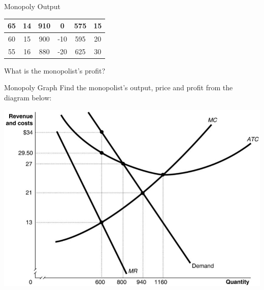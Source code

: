 \documentclass{beamer}
\begin{document}
\begin{frame}[t]{Monopoly Output}
\begin{table}[H]
\begin{tabular}{cccccc}
    65         & 14                                                           & 910                                                      & 0                                                           & 575                                                                & 15                                                      \\ \hline
    60         & 15                                                           & 900                                                      & -10                                                         & 595                                                                & 20                                                      \\ \hline
    55         & 16                                                           & 880                                                      & -20                                                         & 625                                                                & 30                                                     
    \end{tabular}
    \end{table}
    What is the monopolist’s profit?
\end{frame}

\begin{frame}[t]{Monopoly Graph}
    Find the monopolist’s output, price and profit from the diagram below:
    \newline
    \begin{center}
        \includegraphics[scale = .6]{images/monopoly_graph.png}
    \end{center}
\end{frame}
\end{document}

